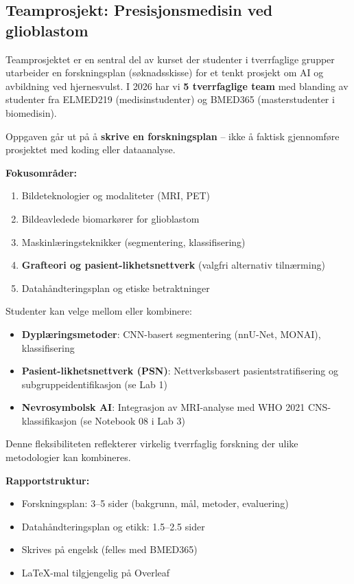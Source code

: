 \documentclass[11pt,a4paper]{article}
\begin{document}
\subsection{Teamprosjekt: Presisjonsmedisin ved glioblastom}

Teamprosjektet er en sentral del av kurset der studenter i tverrfaglige grupper utarbeider en forskningsplan (søknadsskisse) for et tenkt prosjekt om AI og avbildning ved hjernesvulst. I 2026 har vi \textbf{5 tverrfaglige team} med blanding av studenter fra ELMED219 (medisinstudenter) og BMED365 (masterstudenter i biomedisin).

\begin{warningbox}
Oppgaven går ut på å \textbf{skrive en forskningsplan} -- ikke å faktisk gjennomføre prosjektet med koding eller dataanalyse.
\end{warningbox}

\textbf{Fokusområder:}
\begin{enumerate}[nosep]
    \item Bildeteknologier og modaliteter (MRI, PET)
    \item Bildeavledede biomarkører for glioblastom
    \item Maskinlæringsteknikker (segmentering, klassifisering)
    \item \textbf{Grafteori og pasient-likhetsnettverk} (valgfri alternativ tilnærming)
    \item Datahåndteringsplan og etiske betraktninger
\end{enumerate}

\begin{infobox}
Studenter kan velge mellom eller kombinere:
\begin{itemize}[nosep]
    \item \textbf{Dyplæringsmetoder}: CNN-basert segmentering (nnU-Net, MONAI), klassifisering
    \item \textbf{Pasient-likhetsnettverk (PSN)}: Nettverksbasert pasientstratifisering og subgruppeidentifikasjon (se Lab 1)
    \item \textbf{Nevrosymbolsk AI}: Integrasjon av MRI-analyse med WHO 2021 CNS-klassifikasjon (se Notebook 08 i Lab 3)
\end{itemize}
Denne fleksibiliteten reflekterer virkelig tverrfaglig forskning der ulike metodologier kan kombineres.
\end{infobox}

\textbf{Rapportstruktur:}
\begin{itemize}[nosep]
    \item Forskningsplan: 3--5 sider (bakgrunn, mål, metoder, evaluering)
    \item Datahåndteringsplan og etikk: 1.5--2.5 sider
    \item Skrives på engelsk (felles med BMED365)
    \item LaTeX-mal tilgjengelig på Overleaf
\end{itemize}
\end{document}
